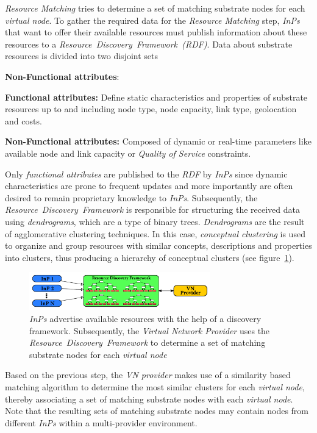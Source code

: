 \documentclass[prodmode,acmtomccap]{acmlarge}
\begin{document}
\emph{Resource Matching} tries to determine a set of matching substrate nodes for each \emph{virtual node}.
To gather the required data for the  \emph{Resource Matching} step, \emph{InPs} that want to offer their available resources must publish information about these resources
to a \emph{Resource~Discovery~Framework~(RDF)}. Data about substrate resources is divided into two disjoint sets

\begin{describe}{{\bfseries Non-Functional attributes\/}:}
	\item[\bfseries Functional attributes:] Define static characteristics and properties of substrate resources up to and including node type, node capacity, link type, geolocation and costs.
	\item[\bfseries Non-Functional attributes:] Composed of dynamic or real-time parameters like available node and link capacity or \emph{Quality of Service} constraints.
\end{describe}

Only \emph{functional attributes} are published to the \emph{RDF} by \emph{InPs} since dynamic characteristics are prone to frequent updates and more importantly
are often desired to remain proprietary knowledge to \emph{InPs}. Subsequently, the \emph{Resource~Discovery~Framework} is responsible for structuring the received data
using \emph{dendrograms}, which are a type of binary trees. \emph{Dendrograms} are the result of agglomerative clustering techniques. In this case, \emph{conceptual clustering}
is used to organize and group resources with similar concepts, descriptions and properties into clusters, thus producing a hierarchy of conceptual clusters (see figure~\ref{fig4}).


\begin{figure}[htb]
	\centering
	\includegraphics[width=0.7\textwidth]{rdf}
	\caption{\emph{InPs} advertise available resources with the help of a discovery framework. 
		Subsequently,  the \emph{Virtual Network Provider} uses the \emph{Resource~Discovery~Framework} to determine a set of matching substrate nodes for each \emph{virtual node}}
	\label{fig4}
\end{figure}

Based on the previous step, the \emph{VN provider} makes use of a similarity based matching algorithm to determine the most similar clusters for each \emph{virtual node}, thereby associating a set of matching substrate
nodes with each \emph{virtual node}. Note that the resulting sets of matching substrate nodes may contain nodes from different \emph{InPs} within a multi-provider environment.
\end{document}
